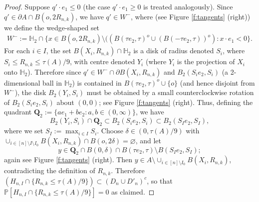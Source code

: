 \documentclass[12pt]{article}
\renewcommand{\Pr}{\mathbb{P}}
\renewcommand{\emptyset}{\varnothing}
\begin{document}
\begin{proof}
Suppose $q' \cdot e_1 \leq 0$ (the case 
 $q' \cdot e_1 \geq 0$ is treated analogously).
	  Since $q' \in   \partial A  \cap B(o,2R_{n,k}) $,
	  we have $q' \in W^-$, 
	  where (see Figure \ref{f:tangents}
	  (right)) we define the wedge-shaped set
          \begin{align*}
		  W^-:= \mathbb H_2 \cap \{x \in B(o,2R_{n,k}) \setminus
                  ( (B(\tau e_2,\tau)^o
		  \cup (B(-\tau e_2,\tau))^o): x \cdot e_1 < 0 \}.
          \end{align*}
	  For each $i \in I$, the set
	  $B(X_i,R_{n,k})
	\cap \mathbb H_2$ 
	is a disk of radius  denoted $S_i$, 
 where $S_i \leq R_{n,k} \leq \tau(A)/9$, with centre denoted $Y_i$
 (where $Y_i$ is the projection of $X_i$ onto $\mathbb H_2$).
	Therefore since $q' \in W^- \cap \partial B(X_i, R_{n,k})$
	and $B_2(S_ie_2, S_i)$
 (a 2-dimensional ball in $\mathbb H_2$) is contained in
	$B(\tau e_2,\tau)^o \cup \{o\}$ (and hence disjoint from $W^-$),
 the disk $B_2(Y_i, S_i)$ must be obtained
 by a small counterclockwise rotation of $B_2(S_i e_2, S_i)$ about
 $(0,0)$; see Figure \ref{f:tangents} (right).
	Thus, defining the quadrant $\mathbf Q_2 := \{a e_1 + b e_2: a,b
	\in (0,\infty)\}$, we have
$$
B_2( Y_i,S_i) \cap \mathbf Q_2 
	\subset B_2(S_ie_2, S_i)
	\subset B_2(S_Ie_2, S_I),
$$
where we set $S_I := \max_{i \in I} S_i$.
Choose $\delta \in (0,\tau(A)/9)$ with $
\cup_{i \in [n ] \setminus I \setminus I_0} B(X_i,R_{n,k}) 
\cap
B(o,2 \delta) 
= \emptyset$, and let
$$
y \in \mathbf Q_2 \cap B(0,\delta) \cap B(\tau e_2, \tau) \setminus B 
(S_I e_2, S_I);
$$
again see Figure \ref{f:tangents} (right).  Then
$y \in A \setminus
\cup_{i \in [n] \setminus I_0 } B(X_i,R_{n,k})$, contradicting the definition of
$R_{n,k}$.
Therefore $(H_{n,I} \cap \{R_{n,k} \leq \tau(A)/9 \})
\subset (D_n \cup D'_n)^c$, so that
$\Pr[H_{n,I} \cap \{R_{n,k} \leq \tau(A)/9 \}] =0$ as claimed.
\end{proof}
\end{document}
